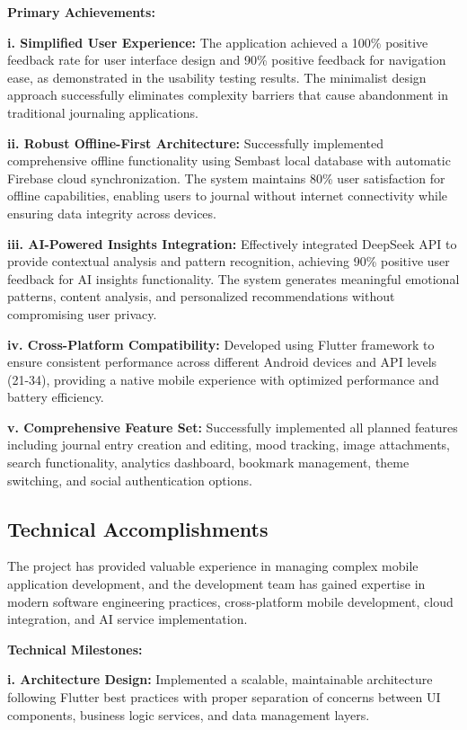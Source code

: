 \textbf{Primary Achievements:}

\textbf{i. Simplified User Experience:} The application achieved a 100\% positive feedback rate for user interface design and 90\% positive feedback for navigation ease, as demonstrated in the usability testing results. The minimalist design approach successfully eliminates complexity barriers that cause abandonment in traditional journaling applications.

\textbf{ii. Robust Offline-First Architecture:} Successfully implemented comprehensive offline functionality using Sembast local database with automatic Firebase cloud synchronization. The system maintains 80\% user satisfaction for offline capabilities, enabling users to journal without internet connectivity while ensuring data integrity across devices.

\textbf{iii. AI-Powered Insights Integration:} Effectively integrated DeepSeek API to provide contextual analysis and pattern recognition, achieving 90\% positive user feedback for AI insights functionality. The system generates meaningful emotional patterns, content analysis, and personalized recommendations without compromising user privacy.

\textbf{iv. Cross-Platform Compatibility:} Developed using Flutter framework to ensure consistent performance across different Android devices and API levels (21-34), providing a native mobile experience with optimized performance and battery efficiency.

\textbf{v. Comprehensive Feature Set:} Successfully implemented all planned features including journal entry creation and editing, mood tracking, image attachments, search functionality, analytics dashboard, bookmark management, theme switching, and social authentication options.

\subsection{Technical Accomplishments}

The project has provided valuable experience in managing complex mobile application development, and the development team has gained expertise in modern software engineering practices, cross-platform mobile development, cloud integration, and AI service implementation.

\textbf{Technical Milestones:}

\textbf{i. Architecture Design:} Implemented a scalable, maintainable architecture following Flutter best practices with proper separation of concerns between UI components, business logic services, and data management layers.

